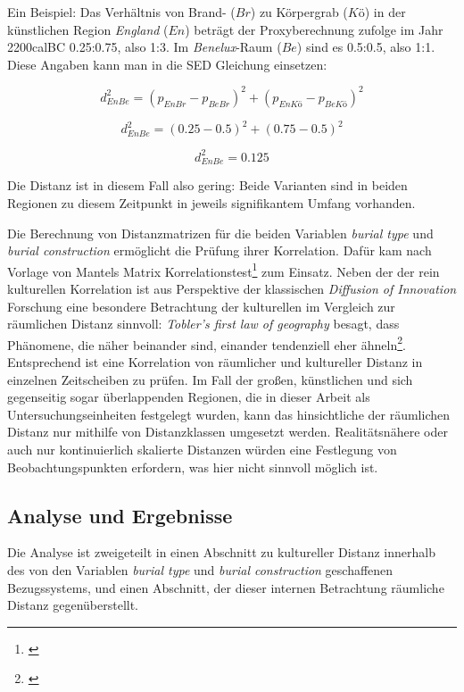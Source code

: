 \documentclass[openany,twoside,twocolumn]{book}
\let\rmarkdownfootnote\footnote%
\def\footnote{\protect\rmarkdownfootnote}
\begin{document}
Ein Beispiel: Das Verhältnis von Brand- (\(Br\)) zu Körpergrab (\(Kö\))
in der künstlichen Region \emph{England} (\(En\)) beträgt der
Proxyberechnung zufolge im Jahr 2200calBC 0.25:0.75, also 1:3. Im
\emph{Benelux}-Raum (\(Be\)) sind es 0.5:0.5, also 1:1. Diese Angaben
kann man in die SED Gleichung einsetzen:

\[d_{En Be}^2 = (p_{En Br} - p_{Be Br})^2 + (p_{En Kö} - p_{Be Kö})^2\]

\[d_{En Be}^2 = (0.25 - 0.5)^2 + (0.75 - 0.5)^2\]

\[d_{En Be}^2 = 0.125\]

Die Distanz ist in diesem Fall also gering: Beide Varianten sind in
beiden Regionen zu diesem Zeitpunkt in jeweils signifikantem Umfang
vorhanden.

Die Berechnung von Distanzmatrizen für die beiden Variablen \emph{burial
type} und \emph{burial construction} ermöglicht die Prüfung ihrer
Korrelation. Dafür kam nach Vorlage von
\textcite{porcic_simulating_2014} Mantels Matrix
Korrelationstest\footnote{\textcite{mantel_detection_1967}} zum Einsatz.
Neben der der rein kulturellen Korrelation ist aus Perspektive der
klassischen \emph{Diffusion of Innovation} Forschung eine besondere
Betrachtung der kulturellen im Vergleich zur räumlichen Distanz
sinnvoll: \emph{Tobler's first law of geography} besagt, dass Phänomene,
die näher beinander sind, einander tendenziell eher ähneln\footnote{\textcite{tobler_computer_1970}}.
Entsprechend ist eine Korrelation von räumlicher und kultureller Distanz
in einzelnen Zeitscheiben zu prüfen. Im Fall der großen, künstlichen und
sich gegenseitig sogar überlappenden Regionen, die in dieser Arbeit als
Untersuchungseinheiten festgelegt wurden, kann das hinsichtliche der
räumlichen Distanz nur mithilfe von Distanzklassen umgesetzt werden.
Realitätsnähere oder auch nur kontinuierlich skalierte Distanzen würden
eine Festlegung von Beobachtungspunkten erfordern, was hier nicht
sinnvoll möglich ist.

\hypertarget{analyse-und-ergebnisse}{%
\subsection{Analyse und Ergebnisse}\label{analyse-und-ergebnisse}}

Die Analyse ist zweigeteilt in einen Abschnitt zu kultureller Distanz
innerhalb des von den Variablen \emph{burial type} und \emph{burial
construction} geschaffenen Bezugssystems, und einen Abschnitt, der
dieser internen Betrachtung räumliche Distanz gegenüberstellt.
\end{document}
